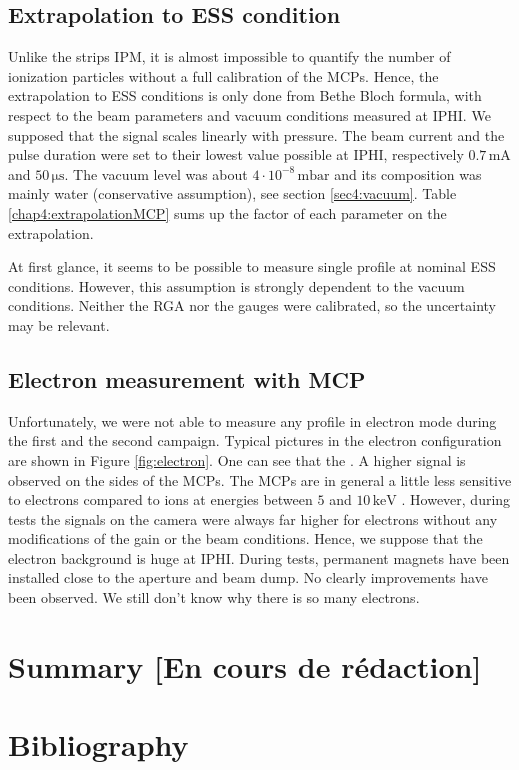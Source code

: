 \begin{refsection}
  \subsection{Extrapolation to ESS condition}
  Unlike the strips IPM, it is almost impossible to quantify the number of ionization particles without a full calibration of the MCPs. Hence, the extrapolation to ESS conditions is only done from Bethe Bloch formula, with respect to the beam parameters and vacuum conditions measured at IPHI. We supposed that the signal scales linearly with pressure. The beam current and the pulse duration were set to their lowest value possible at IPHI, respectively $0.7\,\mathrm{mA}$ and $50\, \mathrm{\mu s}$. The vacuum level was about $4 \cdot 10^{-8}\,\mathrm{mbar}$ and its composition was mainly water (conservative assumption), see section \ref{sec4:vacuum}. Table \ref{chap4:extrapolationMCP} sums up the factor of each parameter on the extrapolation. 
  

  
  At first glance, it seems to be possible to measure single profile at nominal ESS conditions. However, this assumption is strongly dependent to the vacuum conditions. Neither the RGA nor the gauges were calibrated, so the uncertainty may be relevant.


  \subsection{Electron measurement with MCP}
  Unfortunately, we were not able to measure any profile in electron mode during the first and the second campaign.
  Typical pictures in the electron configuration are shown in Figure \ref{fig:electron}. One can see that the . A higher signal is observed on the sides of the MCPs.
  The MCPs are in general a little less sensitive to electrons compared to ions at energies between $5$ and $10\,\mathrm{keV}$ \cite{Wiza1979}.
  However, during tests the signals on the camera were always far higher for electrons without any modifications of the gain or the beam conditions.
  Hence, we suppose that the electron background is huge at IPHI.
  During tests, permanent magnets have been installed close to the aperture and beam dump. No clearly improvements have been observed. We still don't know why there is so many electrons.
  

  \section{Summary [En cours de rédaction]}
  \label{ch4:Summary}

  \cleardoublepage
  \section{Bibliography}
  \label{ch4:bib}
  \printbibliography[heading=subbibliography]

\end{refsection}
